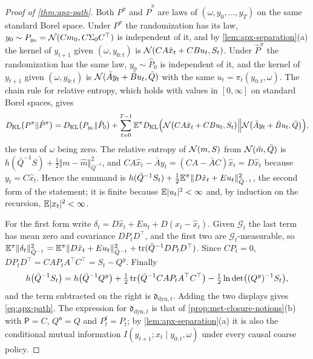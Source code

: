 \begin{proof}[Proof of \cref{thm:apx-path}]
Both $P^\pi$ and $\hat P^\pi$ are laws of $(\omega,y_0,\dots,y_T)$ on the same standard Borel space. Under $P^\pi$ the randomization has its law, $y_0\sim P_{y_0}=\mathcal{N}(Cm_0,C\Sigma_0C^\top)$ is independent of it, and by \cref{lem:apx-separation}(a) the kernel of $y_{t+1}$ given $(\omega,y_{0:t})$ is $\mathcal{N}(CA\hat x_t+CBu_t,S_t)$. Under $\hat P^\pi$ the randomization has the same law, $y_0\sim\hat P_0$ is independent of it, and the kernel of $y_{t+1}$ given $(\omega,y_{0:t})$ is $\mathcal{N}(\bar Ay_t+\bar Bu_t,\bar Q)$ with the same $u_t=\pi_t(y_{0:t},\omega)$. The chain rule for relative entropy, which holds with values in $[0,\infty]$ on standard Borel spaces, gives
\begin{equation*}
D_{\mathrm{KL}}\bigl(P^\pi\Vert\hat P^\pi\bigr)=D_{\mathrm{KL}}\bigl(P_{y_0}\Vert\hat P_0\bigr)+\sum_{t=0}^{T-1}\mathbb{E}^\pi D_{\mathrm{KL}}\Bigl(\mathcal{N}\bigl(CA\hat x_t+CBu_t,S_t\bigr)\Big\Vert\mathcal{N}\bigl(\bar Ay_t+\bar Bu_t,\bar Q\bigr)\Bigr),
\end{equation*}
the term of $\omega$ being zero. The relative entropy of $\mathcal{N}(m,S)$ from $\mathcal{N}(\hat m,\bar Q)$ is $h(\bar Q^{-1}S)+\frac12\Vert m-\hat m\Vert^2_{\bar Q^{-1}}$, and $CA\hat x_t-\bar Ay_t=(CA-\bar AC)\hat x_t=D\hat x_t$ because $y_t=C\hat x_t$. Hence the summand is $h(\bar Q^{-1}S_t)+\frac12\mathbb{E}^\pi\Vert D\hat x_t+Eu_t\Vert^2_{\bar Q^{-1}}$, the second form of the statement; it is finite because $\mathbb{E}\lvert u_t\rvert^2<\infty$ and, by induction on the recursion, $\mathbb{E}\lvert x_t\rvert^2<\infty$.

For the first form write $\delta_t=D\hat x_t+Eu_t+D(x_t-\hat x_t)$. Given $\mathcal G_t$ the last term has mean zero and covariance $DP_tD^\top$, and the first two are $\mathcal G_t$-measurable, so $\mathbb{E}^\pi\Vert\delta_t\Vert^2_{\bar Q^{-1}}=\mathbb{E}^\pi\Vert D\hat x_t+Eu_t\Vert^2_{\bar Q^{-1}}+\operatorname{tr}(\bar Q^{-1}DP_tD^\top)$. Since $CP_t=0$, $DP_tD^\top=CAP_tA^\top C^\top=S_t-Q^y$. Finally
\begin{equation*}
h\bigl(\bar Q^{-1}S_t\bigr)=h\bigl(\bar Q^{-1}Q^y\bigr)+\tfrac12\operatorname{tr}\bigl(\bar Q^{-1}CAP_tA^\top C^\top\bigr)-\tfrac12\ln\det\bigl((Q^y)^{-1}S_t\bigr),
\end{equation*}
and the term subtracted on the right is $\mathfrak d_{\mathrm{dyn},t}$. Adding the two displays gives \cref{eq:apx-path}. The expression for $\mathfrak d_{\mathrm{dyn},t}$ is that of \cref{prop:met-closure-notions}(b) with $\mathsf P=C$, $Q^{\mathfrak n}=Q$ and $P^{\mathrm f}_t=P_t$; by \cref{lem:apx-separation}(a) it is also the conditional mutual information $I(y_{t+1};x_t\mid y_{0:t},\omega)$ under every causal coarse policy.
\end{proof}

